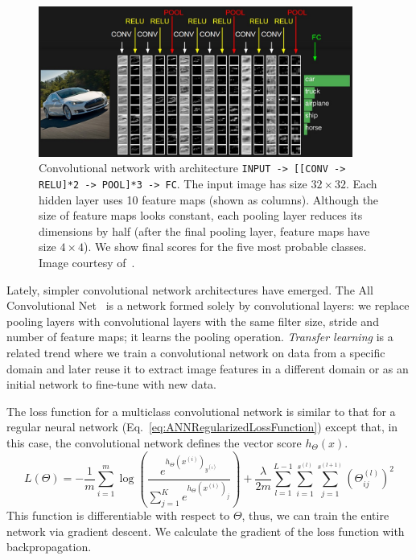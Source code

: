 \begin{figure}[h]
	\centering
	\includegraphics[width = 0.92\textwidth]{plots/convNetExample.jpeg}
	\caption[Convolutional network in action]{Convolutional network with architecture \texttt{INPUT -> [[CONV -> RELU]*2 -> POOL]*3 -> FC}. The input image has size $32\times 32$. Each hidden layer uses 10 feature maps (shown as columns). Although the size of feature maps looks constant, each pooling layer reduces its dimensions by half (after the final pooling layer, feature maps have size $4\times 4$). We show final scores for the five most probable classes. Image courtesy of~\cite{Karpathy2015}.}
	\label{fig:ConvNetExample}
\end{figure}

Lately, simpler convolutional network architectures have emerged. The All Convolutional Net~\cite{Springenberg2014} is a network formed solely by convolutional layers: we replace pooling layers with convolutional layers with the same filter size, stride and number of feature maps; it learns the pooling operation.
\emph{Transfer learning} is a related trend where we train a convolutional network on data from a specific domain and later reuse it to extract image features in a different domain or as an initial network to fine-tune with new data.

The loss function for a multiclass convolutional network is similar to that for a regular neural network (Eq.~\ref{eq:ANNRegularizedLossFunction}) except that, in this case, the convolutional network defines the vector score $h_\Theta(x)$.
\begin{equation}
	L(\Theta) = -\frac{1}{m} \sum_{i=1}^m \log \left ( \frac{ e^{h_\Theta(x^{(i)})_{y^{(i)}}} }{ \sum_{j=1}^K e^{ h_\Theta (x^{(i)})_j} } \right ) + \frac{\lambda}{2m}\sum_{l=1}^{L-1}\sum_{i=1}^{s^{(l)}}\sum_{j=1}^{s^{(l+1)}} \left(\Theta^{(l)}_{ij}\right)^2
	\label{eq:ConvNetLossFunction}
\end{equation}
This function is differentiable with respect to $\Theta$, thus, we can train the entire network via gradient descent. We calculate the gradient of the loss function with backpropagation.%

